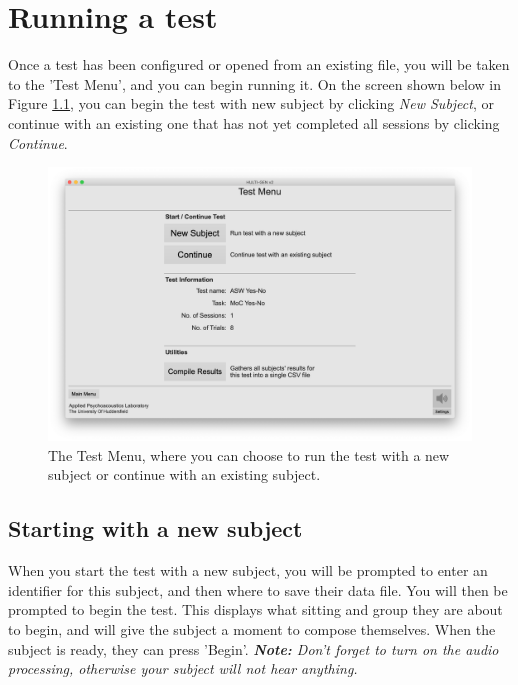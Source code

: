 \chapter{Running a test}\label{chap::run}
Once a test has been configured or opened from an existing file, you will be taken to the 'Test Menu', and you can begin running it. On the screen shown below in Figure \ref{run::testingMenu}, you can begin the test with new subject by clicking \emph{New Subject}, or continue with an existing one that has not yet completed all sessions by clicking \emph{Continue}. 

\begin{figure}[ht]
	\centering
	\includegraphics[width=1.0\textwidth]{./images/run_testMenu.png}
	\caption{The Test Menu, where you can choose to run the test with a new subject or continue with an existing subject.}
	\label{run::testingMenu}
\end{figure}
\pagebreak

\section{Starting with a new subject}
When you start the test with a new subject, you will be prompted to enter an identifier for this subject, and then where to save their data file. You will then be prompted to begin the test. This displays what sitting and group they are about to begin, and will give the subject a moment to compose themselves. When the subject is ready, they can press 'Begin'.
\newline\newline
\noindent
\textit{\textbf{Note:} Don't forget to turn on the audio processing, otherwise your subject will not hear anything.}


